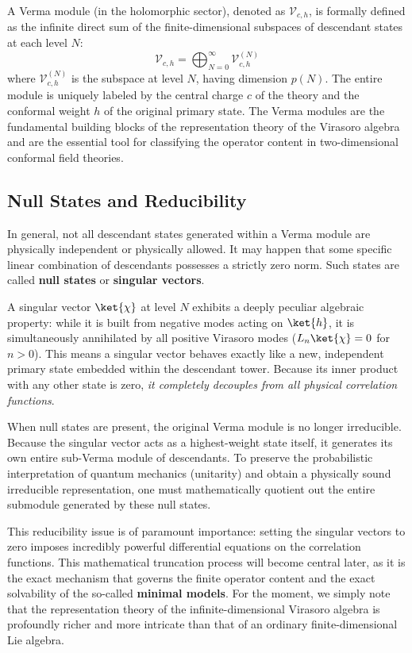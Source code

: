 A Verma module (in the holomorphic sector), denoted as \(\mathcal{V}_{c,h}\), is formally defined as the infinite direct sum of the finite-dimensional subspaces of descendant states at each level \(N\):
\[
    \mathcal{V}_{c,h} = \bigoplus_{N=0}^{\infty} \mathcal{V}_{c,h}^{(N)}
\]
where \(\mathcal{V}_{c,h}^{(N)}\) is the subspace at level \(N\), having dimension \(p(N)\). The entire module is uniquely labeled by the central charge \(c\) of the theory and the conformal weight \(h\) of the original primary state. The Verma modules are the fundamental building blocks of the representation theory of the Virasoro algebra and are the essential tool for classifying the operator content in two-dimensional conformal field theories.

\subsection{Null States and Reducibility}

In general, not all descendant states generated within a Verma module are physically independent or physically allowed. It may happen that some specific linear combination of descendants possesses a strictly zero norm. Such states are called \textbf{null states} or \textbf{singular vectors}.

A singular vector \(\ket{\chi}\) at level \(N\) exhibits a deeply peculiar algebraic property: while it is built from negative modes acting on \(\ket{h}\), it is simultaneously annihilated by all positive Virasoro modes (\(L_n \ket{\chi} = 0\) for \(n > 0\)). This means a singular vector behaves exactly like a new, independent primary state embedded within the descendant tower. Because its inner product with any other state is zero, \textit{it completely decouples from all physical correlation functions}.

When null states are present, the original Verma module is no longer irreducible. Because the singular vector acts as a highest-weight state itself, it generates its own entire sub-Verma module of descendants. To preserve the probabilistic interpretation of quantum mechanics (unitarity) and obtain a physically sound irreducible representation, one must mathematically quotient out the entire submodule generated by these null states.

This reducibility issue is of paramount importance: setting the singular vectors to zero imposes incredibly powerful differential equations on the correlation functions. This mathematical truncation process will become central later, as it is the exact mechanism that governs the finite operator content and the exact solvability of the so-called \textbf{minimal models}. For the moment, we simply note that the representation theory of the infinite-dimensional Virasoro algebra is profoundly richer and more intricate than that of an ordinary finite-dimensional Lie algebra.